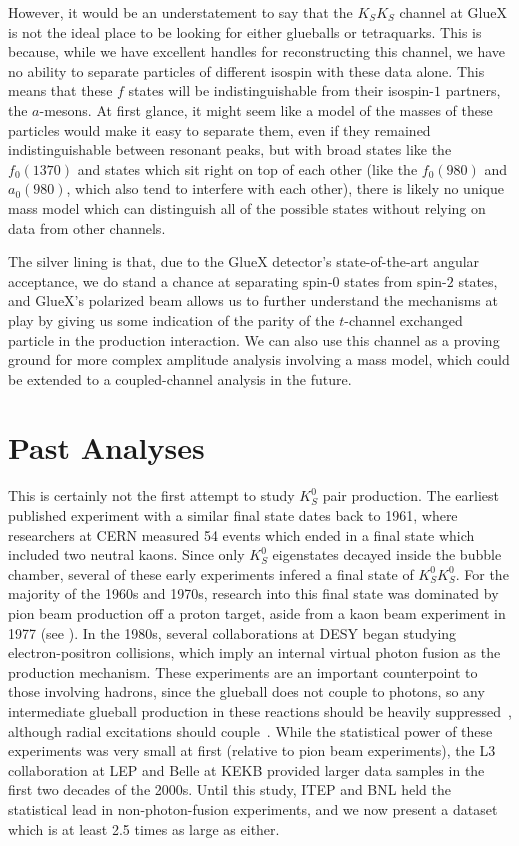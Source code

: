 However, it would be an understatement to say that the $K_SK_S$ channel at GlueX is not the ideal place to be looking for either glueballs or tetraquarks. This is because, while we have excellent handles for reconstructing this channel, we have no ability to separate particles of different isospin with these data alone. This means that these $f$ states will be indistinguishable from their isospin-$1$ partners, the $a$-mesons. At first glance, it might seem like a model of the masses of these particles would make it easy to separate them, even if they remained indistinguishable between resonant peaks, but with broad states like the $f_0(1370)$ and states which sit right on top of each other (like the $f_0(980)$ and $a_0(980)$, which also tend to interfere with each other), there is likely no unique mass model which can distinguish all of the possible states without relying on data from other channels.

The silver lining is that, due to the GlueX detector's state-of-the-art angular acceptance\cite{adhikari_gluex_2021}, we do stand a chance at separating spin-$0$ states from spin-$2$ states, and GlueX's polarized beam allows us to further understand the mechanisms at play by giving us some indication of the parity of the $t$-channel exchanged particle in the production interaction. We can also use this channel as a proving ground for more complex amplitude analysis involving a mass model, which could be extended to a coupled-channel analysis in the future.


\section{Past Analyses}
This is certainly not the first attempt to study $K_S^0$ pair production. The earliest published experiment with a similar final state dates back to 1961, where researchers at CERN measured 54 events which ended in a final state which included two neutral kaons. Since only $K_S^0$ eigenstates decayed inside the bubble chamber, several of these early experiments infered a final state of $K_S^0K_S^0$. For the majority of the 1960s and 1970s, research into this final state was dominated by pion beam production off a proton target, aside from a kaon beam experiment in 1977 (see ). In the 1980s, several collaborations at DESY began studying electron-positron collisions, which imply an internal virtual photon fusion as the production mechanism. These experiments are an important counterpoint to those involving hadrons, since the glueball does not couple to photons, so any intermediate glueball production in these reactions should be heavily suppressed~\cite{acciarri_k0sk0s_2001}, although radial excitations should couple~\cite{mathieu_physics_2009}. While the statistical power of these experiments was very small at first (relative to pion beam experiments), the L3 collaboration at LEP and Belle at KEKB provided larger data samples in the first two decades of the 2000s. Until this study, ITEP and BNL held the statistical lead in non-photon-fusion experiments, and we now present a dataset which is at least 2.5 times as large as either.

